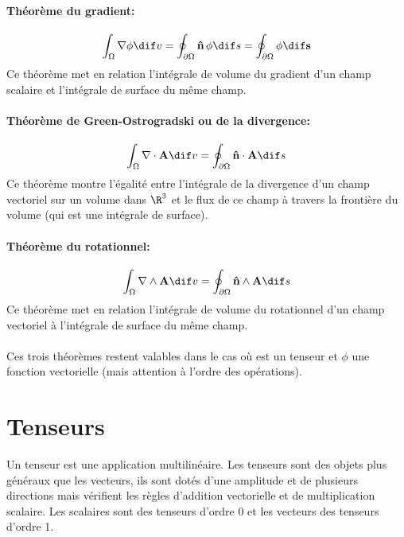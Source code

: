 \paragraph*{Théorème du gradient:} $$\int_{\Omega}\nabla\phi \dif v=\oint_{\partial\Omega}\fv{\^n}\,\phi\dif s=\oint_{\partial\Omega}\phi\dif \fv{s}$$
Ce théorème met en relation l'intégrale de volume du gradient d'un champ scalaire et l'intégrale de surface du même champ.
\paragraph*{Théorème de Green-Ostrogradski ou de la divergence:}
$$\int_{\Omega}\nabla\cdot\fv{A}\dif v=\oint_{\partial\Omega}\fv{\^n}\cdot \fv{A}\dif s$$
Ce théorème montre l'égalité entre l'intégrale de la divergence d'un champ vectoriel sur un volume dans $\R^3$ et le flux de ce champ à travers la frontière du volume (qui est une intégrale de surface).
\paragraph*{Théorème du rotationnel: }
$$\int_{\Omega}\nabla\wedge\fv{A}\dif v=\oint_{\partial\Omega}\fv{\^n}\wedge\fv{A}\dif s$$
Ce théorème met en relation l'intégrale de volume du rotationnel d'un champ vectoriel à l'intégrale de surface du même champ.
\paragraph{}
Ces trois théorèmes restent valables dans le cas où  est un tenseur et $\phi$ une fonction vectorielle (mais attention à l'ordre des opérations).

\section{Tenseurs}
Un tenseur est une application multilinéaire. Les tenseurs sont des objets plus généraux que les vecteurs, ils sont dotés d'une amplitude et de plusieurs directions mais vérifient les règles d'addition vectorielle et de multiplication scalaire. Les scalaires sont des tenseurs d'ordre 0 et les vecteurs des tenseurs d'ordre 1.
